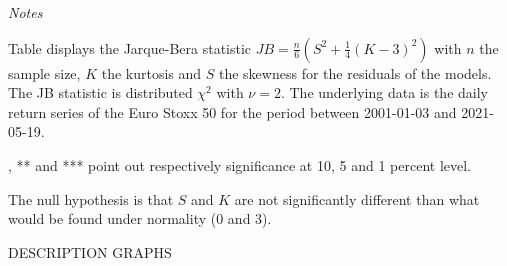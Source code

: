 \documentclass[a4paper, nobind]{templates/ociamthesis}
\begin{document}
\begin{landscape}\begin{table}[h!]

\caption{\label{tab:JBTable}Jarque-Bera Test on standardized residuals}
\centering
\begin{threeparttable}
\begin{tablenotes}[para]
\item \textit{Notes} 
\item Table displays the Jarque-Bera statistic $JB=\frac{n}{6}(S^{2}+\frac{1}{4}(K-3)^{2})$ with $n$ the sample size, $K$ the kurtosis and $S$ the skewness for the residuals of the models. The JB statistic is distributed $\chi^2$ with $\nu = 2$. The underlying data is the daily return series of the Euro Stoxx 50 for the period between 2001-01-03 and 2021-05-19.
\item *, ** and *** point out respectively significance at 10, 5 and 1 percent level.
\item The null hypothesis is that $S$ and $K$ are not significantly different than what would be found under normality (0 and 3).
\end{tablenotes}
\end{threeparttable}
\end{table}
\end{landscape}

DESCRIPTION GRAPHS
\end{document}
